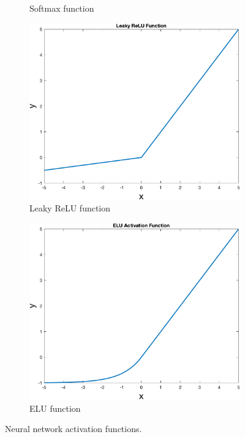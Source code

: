 \documentclass[12pt]{article}
\begin{document}
\begin{figure}
\begin{subfigure}[b]{0.4\textwidth}
            \caption{Softmax function}
            \label{fig:sigmsoftmaxoid}
        \end{subfigure}
        \begin{subfigure}[b]{0.4\textwidth}
            \includegraphics[width=\textwidth]{figures/leakyrelu}
            \caption{Leaky ReLU function}
            \label{fig:leakyrelu}
        \end{subfigure}
        \hspace{0.1\textwidth}
        \begin{subfigure}[b]{0.4\textwidth}
            \includegraphics[width=\textwidth]{figures/elu}
            \caption{ELU function}
            \label{fig:elu}
        \end{subfigure}
        \caption{Neural network activation functions.}
        \label{fig:activationfunctions}
    \end{figure}
\end{document}
